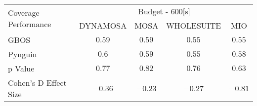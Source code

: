 \begin{tabular}{lcccc}\toprule 
\multirow{2}{*}{Coverage Performance} & \multicolumn{4}{c}{Budget - 600[s] } \\ \cmidrule(lr){2-5}  
                                      & DYNAMOSA&MOSA&WHOLESUITE&MIO                         \\ \midrule 
GBOS                                  & \(0.59\)&\(0.59\)&\(0.55\)&\(0.55\)                       \\ 
Pynguin                               & \(0.6\)&\(0.59\)&\(0.55\)&\(0.58\)                       \\ 
p Value                               & \(0.77\)&\(0.82\)&\(0.76\)&\(0.63\)                     \\ 
Cohen's D Effect Size                 & \(-0.36\)&\(-0.23\)&\(-0.27\)&\(-0.81\)                       \\ 
\bottomrule 
\end{tabular}